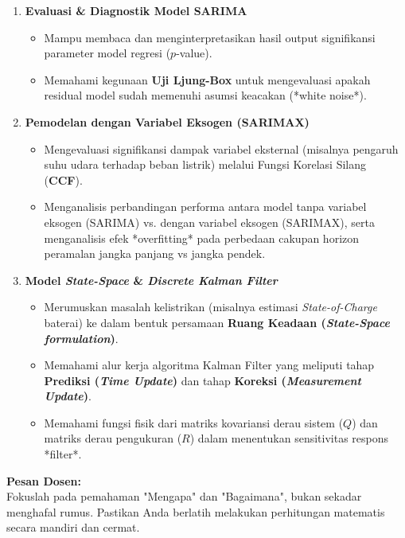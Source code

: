 \documentclass[11pt,a4paper]{article}
\begin{document}
\begin{enumerate}[label=\textbf{\arabic*.}, leftmargin=1.5em, itemsep=8pt]
    \item \textbf{Evaluasi \& Diagnostik Model SARIMA}
    \begin{itemize}[label=$\circ$]
        \item Mampu membaca dan menginterpretasikan hasil output signifikansi parameter model regresi ($p$-value).
        \item Memahami kegunaan \textbf{Uji Ljung-Box} untuk mengevaluasi apakah residual model sudah memenuhi asumsi keacakan (*white noise*).
    \end{itemize}

    \item \textbf{Pemodelan dengan Variabel Eksogen (SARIMAX)}
    \begin{itemize}[label=$\circ$]
        \item Mengevaluasi signifikansi dampak variabel eksternal (misalnya pengaruh suhu udara terhadap beban listrik) melalui Fungsi Korelasi Silang (\textbf{CCF}).
        \item Menganalisis perbandingan performa antara model tanpa variabel eksogen (SARIMA) vs. dengan variabel eksogen (SARIMAX), serta menganalisis efek *overfitting* pada perbedaan cakupan horizon peramalan jangka panjang vs jangka pendek.
    \end{itemize}

    \item \textbf{Model \textit{State-Space} \& \textit{Discrete Kalman Filter}}
    \begin{itemize}[label=$\circ$]
        \item Merumuskan masalah kelistrikan (misalnya estimasi \textit{State-of-Charge} baterai) ke dalam bentuk persamaan \textbf{Ruang Keadaan (\textit{State-Space formulation})}.
        \item Memahami alur kerja algoritma Kalman Filter yang meliputi tahap \textbf{Prediksi (\textit{Time Update})} dan tahap \textbf{Koreksi (\textit{Measurement Update})}.
        \item Memahami fungsi fisik dari matriks kovariansi derau sistem ($Q$) dan matriks derau pengukuran ($R$) dalam menentukan sensitivitas respons *filter*.
    \end{itemize}
\end{enumerate}

\vspace{0.3cm}
\begin{center}
    \colorbox{goldaccent}{\parbox{0.92\textwidth}{\centering\textbf{\color{white}Pesan Dosen:}\\ \small Fokuslah pada pemahaman "Mengapa" dan "Bagaimana", bukan sekadar menghafal rumus. Pastikan Anda berlatih melakukan perhitungan matematis secara mandiri dan cermat.}}
\end{center}
\end{document}
